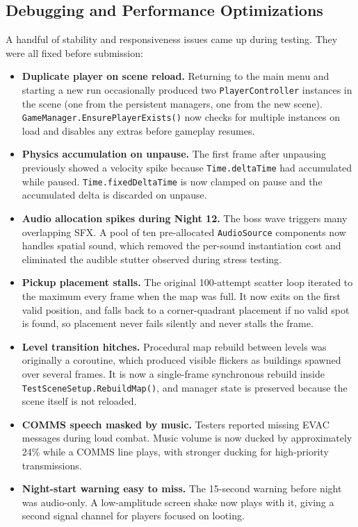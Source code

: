 \documentclass[11pt,a4paper]{article}
\begin{document}
\subsection{Debugging and Performance Optimizations}

A handful of stability and responsiveness issues came up during testing. They were all fixed before submission:

\begin{itemize}[noitemsep]
  \item \textbf{Duplicate player on scene reload.} Returning to the main menu and starting a new run occasionally produced two \texttt{PlayerController} instances in the scene (one from the persistent managers, one from the new scene). \texttt{GameManager.EnsurePlayerExists()} now checks for multiple instances on load and disables any extras before gameplay resumes.
  \item \textbf{Physics accumulation on unpause.} The first frame after unpausing previously showed a velocity spike because \texttt{Time.deltaTime} had accumulated while paused. \texttt{Time.fixedDeltaTime} is now clamped on pause and the accumulated delta is discarded on unpause.
  \item \textbf{Audio allocation spikes during Night 12.} The boss wave triggers many overlapping SFX. A pool of ten pre-allocated \texttt{AudioSource} components now handles spatial sound, which removed the per-sound instantiation cost and eliminated the audible stutter observed during stress testing.
  \item \textbf{Pickup placement stalls.} The original 100-attempt scatter loop iterated to the maximum every frame when the map was full. It now exits on the first valid position, and falls back to a corner-quadrant placement if no valid spot is found, so placement never fails silently and never stalls the frame.
  \item \textbf{Level transition hitches.} Procedural map rebuild between levels was originally a coroutine, which produced visible flickers as buildings spawned over several frames. It is now a single-frame synchronous rebuild inside \texttt{TestSceneSetup.RebuildMap()}, and manager state is preserved because the scene itself is not reloaded.
  \item \textbf{COMMS speech masked by music.} Testers reported missing EVAC messages during loud combat. Music volume is now ducked by approximately 24\% while a COMMS line plays, with stronger ducking for high-priority transmissions.
  \item \textbf{Night-start warning easy to miss.} The 15-second warning before night was audio-only. A low-amplitude screen shake now plays with it, giving a second signal channel for players focused on looting.
\end{itemize}
\end{document}
